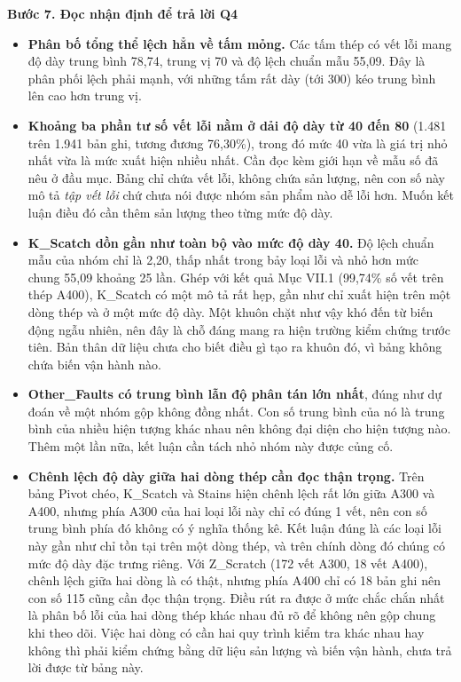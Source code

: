 \documentclass[12pt]{article}
\begin{document}
\noindent
\textbf{Bước 7. Đọc nhận định để trả lời Q4}

\begin{itemize}
  \item \textbf{Phân bố tổng thể lệch hẳn về tấm mỏng.} Các tấm thép có vết lỗi mang độ dày trung bình 78,74, trung vị 70 và độ lệch chuẩn mẫu 55,09. Đây là phân phối lệch phải mạnh, với những tấm rất dày (tới 300) kéo trung bình lên cao hơn trung vị.
  \item \textbf{Khoảng ba phần tư số vết lỗi nằm ở dải độ dày từ 40 đến 80} (1.481 trên 1.941 bản ghi, tương đương 76,30\%), trong đó mức 40 vừa là giá trị nhỏ nhất vừa là mức xuất hiện nhiều nhất. Cần đọc kèm giới hạn về mẫu số đã nêu ở đầu mục. Bảng chỉ chứa vết lỗi, không chứa sản lượng, nên con số này mô tả \emph{tập vết lỗi} chứ chưa nói được nhóm sản phẩm nào dễ lỗi hơn. Muốn kết luận điều đó cần thêm sản lượng theo từng mức độ dày.
  \item \textbf{K\_Scatch dồn gần như toàn bộ vào mức độ dày 40.} Độ lệch chuẩn mẫu của nhóm chỉ là 2,20, thấp nhất trong bảy loại lỗi và nhỏ hơn mức chung 55,09 khoảng 25 lần. Ghép với kết quả Mục VII.1 (99,74\% số vết trên thép A400), K\_Scatch có một mô tả rất hẹp, gần như chỉ xuất hiện trên một dòng thép và ở một mức độ dày. Một khuôn chặt như vậy khó đến từ biến động ngẫu nhiên, nên đây là chỗ đáng mang ra hiện trường kiểm chứng trước tiên. Bản thân dữ liệu chưa cho biết điều gì tạo ra khuôn đó, vì bảng không chứa biến vận hành nào.
  \item \textbf{Other\_Faults có trung bình lẫn độ phân tán lớn nhất}, đúng như dự đoán về một nhóm gộp không đồng nhất. Con số trung bình của nó là trung bình của nhiều hiện tượng khác nhau nên không đại diện cho hiện tượng nào. Thêm một lần nữa, kết luận cần tách nhỏ nhóm này được củng cố.
  \item \textbf{Chênh lệch độ dày giữa hai dòng thép cần đọc thận trọng.} Trên bảng Pivot chéo, K\_Scatch và Stains hiện chênh lệch rất lớn giữa A300 và A400, nhưng phía A300 của hai loại lỗi này chỉ có đúng 1 vết, nên con số trung bình phía đó không có ý nghĩa thống kê. Kết luận đúng là các loại lỗi này gần như chỉ tồn tại trên một dòng thép, và trên chính dòng đó chúng có mức độ dày đặc trưng riêng. Với Z\_Scratch (172 vết A300, 18 vết A400), chênh lệch giữa hai dòng là có thật, nhưng phía A400 chỉ có 18 bản ghi nên con số 115 cũng cần đọc thận trọng. Điều rút ra được ở mức chắc chắn nhất là phân bố lỗi của hai dòng thép khác nhau đủ rõ để không nên gộp chung khi theo dõi. Việc hai dòng có cần hai quy trình kiểm tra khác nhau hay không thì phải kiểm chứng bằng dữ liệu sản lượng và biến vận hành, chưa trả lời được từ bảng này.
\end{itemize}
\end{document}
